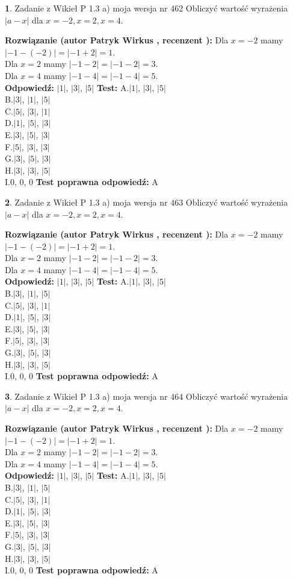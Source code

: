 \documentclass[12pt, a4paper]{article}
\theoremstyle{definition} %
\newtheorem{zad}{}
\newcommand{\zadStart}[1]{\begin{zad}#1\newline}
\newcommand{\zadStop}{\end{zad}}
\newcommand{\rozwStart}[2]{\noindent \textbf{Rozwiązanie (autor #1 , recenzent #2): }\newline}
\newcommand{\rozwStop}{\newline}
\newcommand{\odpStart}{\noindent \textbf{Odpowiedź:}\newline}
\newcommand{\odpStop}{\newline}
\newcommand{\testStart}{\noindent \textbf{Test:}\newline}
\newcommand{\testStop}{\newline}
\newcommand{\kluczStart}{\noindent \textbf{Test poprawna odpowiedź:}\newline}
\newcommand{\kluczStop}{\newline}
\begin{document}
\zadStart{Zadanie z Wikieł P 1.3 a) moja wersja nr 462}
Obliczyć wartość wyrażenia $|a - x|$ dla $x=-2,x=2,x=4$.
\zadStop
\rozwStart{Patryk Wirkus}{}
Dla $x = -2$ mamy $|-1 - (-2)| = |-1 + 2| = 1$.\\
Dla $x = 2$ mamy $|-1 - 2| = |-1 - 2| = 3$.\\
Dla $x = 4$ mamy $|-1 - 4| = |-1 - 4| = 5$.\\
\rozwStop
\odpStart
$|1|$, $|3|$, $|5|$
\odpStop
\testStart
A.$|1|$, $|3|$, $|5|$\\
B.$|3|$, $|1|$, $|5|$\\
C.$|5|$, $|3|$, $|1|$\\
D.$|1|$, $|5|$, $|3|$\\
E.$|3|$, $|5|$, $|3|$\\
F.$|5|$, $|3|$, $|3|$\\
G.$|3|$, $|5|$, $|3|$\\
H.$|3|$, $|3|$, $|5|$\\
I.$0$, $0$, $0$
\testStop
\kluczStart
A
\kluczStop



\zadStart{Zadanie z Wikieł P 1.3 a) moja wersja nr 463}
Obliczyć wartość wyrażenia $|a - x|$ dla $x=-2,x=2,x=4$.
\zadStop
\rozwStart{Patryk Wirkus}{}
Dla $x = -2$ mamy $|-1 - (-2)| = |-1 + 2| = 1$.\\
Dla $x = 2$ mamy $|-1 - 2| = |-1 - 2| = 3$.\\
Dla $x = 4$ mamy $|-1 - 4| = |-1 - 4| = 5$.\\
\rozwStop
\odpStart
$|1|$, $|3|$, $|5|$
\odpStop
\testStart
A.$|1|$, $|3|$, $|5|$\\
B.$|3|$, $|1|$, $|5|$\\
C.$|5|$, $|3|$, $|1|$\\
D.$|1|$, $|5|$, $|3|$\\
E.$|3|$, $|5|$, $|3|$\\
F.$|5|$, $|3|$, $|3|$\\
G.$|3|$, $|5|$, $|3|$\\
H.$|3|$, $|3|$, $|5|$\\
I.$0$, $0$, $0$
\testStop
\kluczStart
A
\kluczStop



\zadStart{Zadanie z Wikieł P 1.3 a) moja wersja nr 464}
Obliczyć wartość wyrażenia $|a - x|$ dla $x=-2,x=2,x=4$.
\zadStop
\rozwStart{Patryk Wirkus}{}
Dla $x = -2$ mamy $|-1 - (-2)| = |-1 + 2| = 1$.\\
Dla $x = 2$ mamy $|-1 - 2| = |-1 - 2| = 3$.\\
Dla $x = 4$ mamy $|-1 - 4| = |-1 - 4| = 5$.\\
\rozwStop
\odpStart
$|1|$, $|3|$, $|5|$
\odpStop
\testStart
A.$|1|$, $|3|$, $|5|$\\
B.$|3|$, $|1|$, $|5|$\\
C.$|5|$, $|3|$, $|1|$\\
D.$|1|$, $|5|$, $|3|$\\
E.$|3|$, $|5|$, $|3|$\\
F.$|5|$, $|3|$, $|3|$\\
G.$|3|$, $|5|$, $|3|$\\
H.$|3|$, $|3|$, $|5|$\\
I.$0$, $0$, $0$
\testStop
\kluczStart
A
\kluczStop
\end{document}
